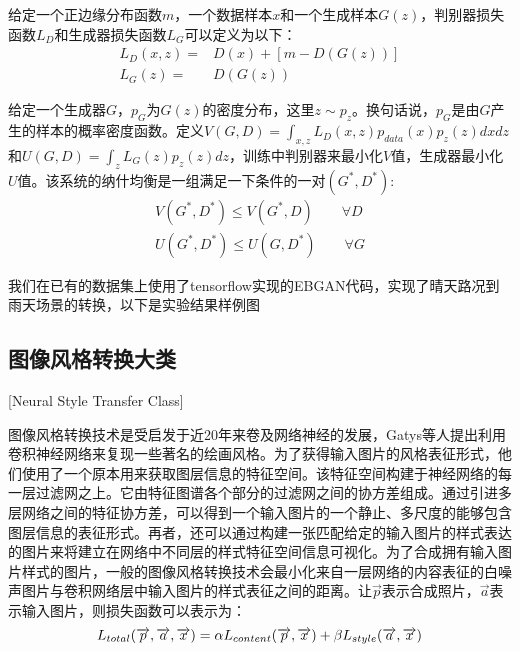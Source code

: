 给定一个正边缘分布函数$m$，一个数据样本$x$和一个生成样本$G(z)$，判别器损失函数$L_D$和生成器损失函数$L_G$可以定义为以下：
\begin{align*}
    L_D(x, z) = & D(x) + [m - D(G(z))] \\
    L_G(z) = & D(G(z))
\end{align*}

给定一个生成器$G$，$p_G$为$G(z)$的密度分布，这里$z\sim p_z$。换句话说，$p_G$是由$G$产生的样本的概率密度函数。定义$V(G,D)=\int_{x,z}L_D(x,z)p_{data}(x)p_z(z)dxdz$和$U(G,D)=\int_zL_G(z)p_z(z)dz$，训练中判别器来最小化$V$值，生成器最小化$U$值。该系统的纳什均衡是一组满足一下条件的一对$(G^*,D^*)$:
\begin{align*}
    V(G^*,D^*) \leq V(G^*,D) \quad\quad \forall D \\
    U(G^*,D^*) \leq U(G,D^*) \quad\quad \forall G
\end{align*}

我们在已有的数据集上使用了tensorflow实现的EBGAN代码\cite{ebgan-github}，实现了晴天路况到雨天场景的转换，以下是实验结果样例图

\begin{figure}[h]
    \centering
    \caption{}
\end{figure}


\subsection{图像风格转换大类}[Neural Style Transfer Class]

图像风格转换技术是受启发于近20年来卷及网络神经的发展，Gatys等人\cite{nst}提出利用卷积神经网络来复现一些著名的绘画风格。为了获得输入图片的风格表征形式，他们使用了一个原本用来获取图层信息的特征空间。该特征空间构建于神经网络的每一层过滤网之上。它由特征图谱各个部分的过滤网之间的协方差组成。通过引进多层网络之间的特征协方差，可以得到一个输入图片的一个静止、多尺度的能够包含图层信息的表征形式。再者，还可以通过构建一张匹配给定的输入图片的样式表达的图片来将建立在网络中不同层的样式特征空间信息可视化。为了合成拥有输入图片样式的图片，一般的图像风格转换技术会最小化来自一层网络的内容表征的白噪声图片与卷积网络层中输入图片的样式表征之间的距离。让$\overrightarrow{p}$表示合成照片，$\overrightarrow{a}$表示输入图片，则损失函数可以表示为：
$$
\centering
L_{total}(\overrightarrow{p},\overrightarrow{a}, \overrightarrow{x})=
\alpha L_{content}(\overrightarrow{p}, \overrightarrow{x}) +
\beta L_{style}(\overrightarrow{a}, \overrightarrow{x})
$$

